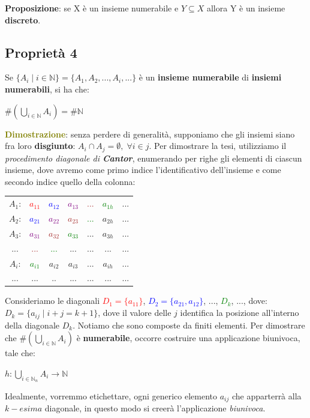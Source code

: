 \textbf{Proposizione}: se X è un insieme numerabile e $Y \subseteq X$ allora Y è un insieme \textbf{discreto}.

\newpage
\subsection{Proprietà 4}
Se $\{A_i \; | \; i \in \mathbb{N}\} = \{A_1, A_2, ..., A_i, ...\}$ è un \textbf{insieme numerabile} di \textbf{insiemi numerabili}, si ha che:
\begin{center}
    $\#(\bigcup_{i \in \mathbb{N}}A_i) = \#\mathbb{N}$
\end{center}
\textcolor{olive}{\textbf{Dimostrazione}}: senza perdere di generalità, supponiamo che gli insiemi siano fra loro \textbf{disgiunto}: $A_i \cap A_j = \emptyset, \; \forall i \in j$. Per dimostrare la tesi, utilizziamo il \textit{procedimento diagonale di \textbf{Cantor}}, enumerando per righe gli elementi di ciascun insieme, dove avremo come primo indice l'identificativo dell'insieme e come secondo indice quello della colonna:

\begin{center}
    \begin{tabular}{ccccccc}
        $A_1$: & \textcolor{red}{$a_{11}$} & \textcolor{blue}{$a_{12}$} & \textcolor{purple}{$a_{13}$} & \textcolor{brown}{...} & \textcolor{green}{$a_{1h}$} & ... \\
        $A_2$: & \textcolor{blue}{$a_{21}$} & \textcolor{purple}{$a_{22}$} & \textcolor{brown}{$a_{23}$} & \textcolor{green}{...} & $a_{2h}$ & ... \\
        $A_3$: & \textcolor{purple}{$a_{31}$} & \textcolor{brown}{$a_{32}$} & \textcolor{green}{$a_{33}$} & ... & $a_{3h}$ & ... \\
        ... & \textcolor{brown}{...} & \textcolor{green}{...} & ... & ... & ... & ... \\
        $A_i$: & \textcolor{green}{$a_{i1}$} & $a_{i2}$ & $a_{i3}$ & ... & $a_{ih}$ & ... \\
        ... & ... & .. & ... & ... & ... & ... \\
    \end{tabular}
\end{center}
Consideriamo le diagonali \textcolor{red}{$D_1=\{a_{11}\}$}, \textcolor{blue}{$D_2=\{a_{21}, a_{12}\}$}, ..., \textcolor{green}{$D_k$}, ..., dove: $D_k = \{a_{ij} \; | \; i + j = k + 1\}$, dove il valore delle $j$ identifica la posizione all'interno della diagonale $D_k$. Notiamo che sono composte da finiti elementi. Per dimostrare che $\#(\bigcup_{i \in \mathbb{N}}A_i)$ è \textbf{numerabile}, occorre costruire una applicazione biunivoca, tale che:
\begin{center}
    $h : \bigcup_{i \in \mathbb{N}_n} A_i \rightarrow \mathbb{N}$
\end{center}
Idealmente, vorremmo etichettare, ogni generico elemento $a_{ij}$ che apparterrà alla $k-esima$ diagonale, in questo modo si creerà l'applicazione \textit{biunivoca}.

